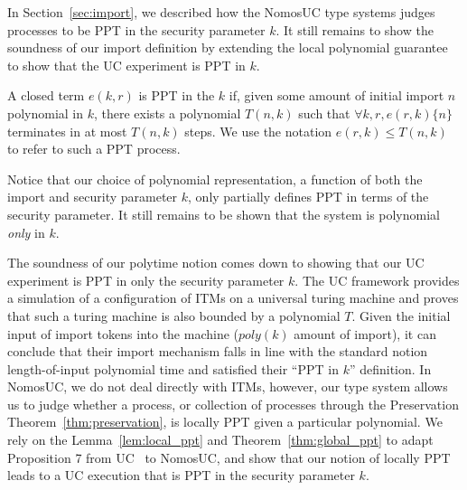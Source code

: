 In Section~\ref{sec:import}, we described how the NomosUC type systems judges processes to be PPT in the security parameter $k$. 
It still remains to show the soundness of our import definition by extending the local polynomial guarantee to show that the UC experiment is PPT in $k$.

\begin{ddef}[PPT in $k$]\label{def:ppt}
A closed term $e(k,r)$ is  PPT in the $k$ if, given some amount of initial import $n$ polynomial in $k$, there exists a polynomial $T(n,k)$ such that $\forall k, r, e(r,k) \{n\}$ terminates in at most $T(n,k)$ steps.
We use the notation $e(r,k) \leq T(n,k)$ to refer to such a PPT process.
\end{ddef}
Notice that our choice of polynomial representation, a function of both the import and security parameter $k$, only partially defines PPT in terms of the security parameter. It still remains to be shown that the system is polynomial \emph{only} in $k$.

The soundness of our polytime notion comes down to showing that our UC experiment is PPT in only the security parameter $k$. 
The UC framework provides a simulation of a configuration of ITMs on a universal turing machine and proves that such a turing machine is also bounded by a polynomial $T$. 
Given the initial input of import tokens into the machine ($poly(k)$ amount of import), it can conclude that their import mechanism falls in line with the standard notion length-of-input polynomial time and satisfied their ``PPT in $k$'' definition. 
In NomosUC, we do not deal directly with ITMs, however, our type system allows us to judge whether a process, or collection of processes through the Preservation Theorem~\ref{thm:preservation}, is locally PPT given a particular polynomial. 
We rely on the Lemma~\ref{lem:local_ppt} and Theorem~\ref{thm:global_ppt} to adapt Proposition 7 from UC~\cite{uc} to NomosUC, and show that our notion of locally PPT leads to a UC execution that is PPT in the security parameter $k$.

